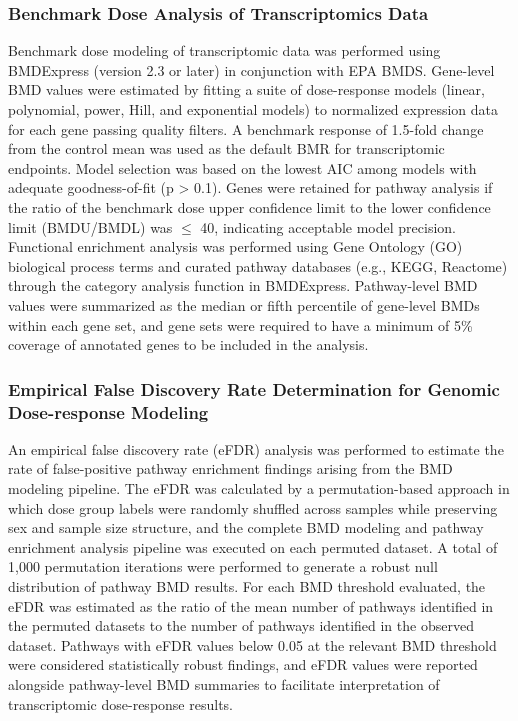 \subsubsection{Benchmark Dose Analysis of Transcriptomics Data}

Benchmark dose modeling of transcriptomic data was performed using BMDExpress (version 2.3 or later) in conjunction with EPA BMDS. Gene-level BMD values were estimated by fitting a suite of dose-response models (linear, polynomial, power, Hill, and exponential models) to normalized expression data for each gene passing quality filters. A benchmark response of 1.5-fold change from the control mean was used as the default BMR for transcriptomic endpoints. Model selection was based on the lowest AIC among models with adequate goodness-of-fit (p > 0.1). Genes were retained for pathway analysis if the ratio of the benchmark dose upper confidence limit to the lower confidence limit (BMDU/BMDL) was \ensuremath{\le} 40, indicating acceptable model precision. Functional enrichment analysis was performed using Gene Ontology (GO) biological process terms and curated pathway databases (e.g., KEGG, Reactome) through the category analysis function in BMDExpress. Pathway-level BMD values were summarized as the median or fifth percentile of gene-level BMDs within each gene set, and gene sets were required to have a minimum of 5\% coverage of annotated genes to be included in the analysis.

\subsubsection{Empirical False Discovery Rate Determination for Genomic Dose-response Modeling}

An empirical false discovery rate (eFDR) analysis was performed to estimate the rate of false-positive pathway enrichment findings arising from the BMD modeling pipeline. The eFDR was calculated by a permutation-based approach in which dose group labels were randomly shuffled across samples while preserving sex and sample size structure, and the complete BMD modeling and pathway enrichment analysis pipeline was executed on each permuted dataset. A total of 1,000 permutation iterations were performed to generate a robust null distribution of pathway BMD results. For each BMD threshold evaluated, the eFDR was estimated as the ratio of the mean number of pathways identified in the permuted datasets to the number of pathways identified in the observed dataset. Pathways with eFDR values below 0.05 at the relevant BMD threshold were considered statistically robust findings, and eFDR values were reported alongside pathway-level BMD summaries to facilitate interpretation of transcriptomic dose-response results.

